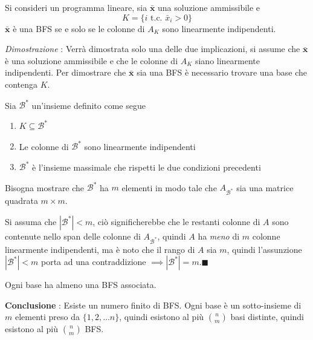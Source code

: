 \documentclass[10pt, letterpaper]{report}
\begin{document}
\begin{proposizione}
    Si consideri un programma lineare, sia $\mathbf{\bar x}$ una soluzione ammissibile e $$ K=\{i \text{ t.c. }\bar x_i>0\}$$ $\mathbf{\bar x}$ è una BFS se e solo se le colonne di $A_K$ sono linearmente indipendenti.
\end{proposizione}
\textit{Dimostrazione} : Verrà dimostrata solo una delle due implicazioni, si assume che $\mathbf{\bar x}$ è una soluzione ammissibile e che le colonne di $A_K$ siano linearmente indipendenti. Per dimostrare che $\mathbf{\bar x}$ sia una BFS è necessario trovare una base che contenga $K$.

Sia $\mathcal B^*$ un'insieme definito come segue\begin{enumerate}
    \item $K\subseteq\mathcal B^*$
    \item Le colonne di $\mathcal B^*$ sono linearmente indipendenti 
    \item $\mathcal B^*$ è l'insieme massimale che rispetti le due condizioni precedenti
\end{enumerate}
Bisogna mostrare che $\mathcal B^*$ ha $m$ elementi in modo tale che $A_{\mathcal B^*}$ sia una matrice quadrata $m\times m$.

Si assuma che $|\mathcal B^*|<m$, ciò significherebbe che le restanti colonne di $A$ sono contenute nello span delle colonne di $A_{\mathcal B^*}$, quindi $A$ ha \textit{meno} di $m$ colonne linearmente indipendenti, ma è noto che il rango di $A$ sia $m$, quindi l'assunzione  $|\mathcal B^*|<m$ porta ad una contraddizione $\implies |\mathcal B^*|=m$.\hfill$\blacksquare$
\begin{osservazione}
    Ogni base ha almeno una BFS associata.
\end{osservazione}
\textbf{Conclusione} : Esiste un numero finito di BFS. Ogni base è un sotto-insieme di $m$ elementi preso da $\{1,2,\dots n\}$, quindi esistono al più $\binom{n}{m}$ basi distinte, quindi esistono al più $\binom{n}{m}$  BFS.\bigskip 
\end{document}
